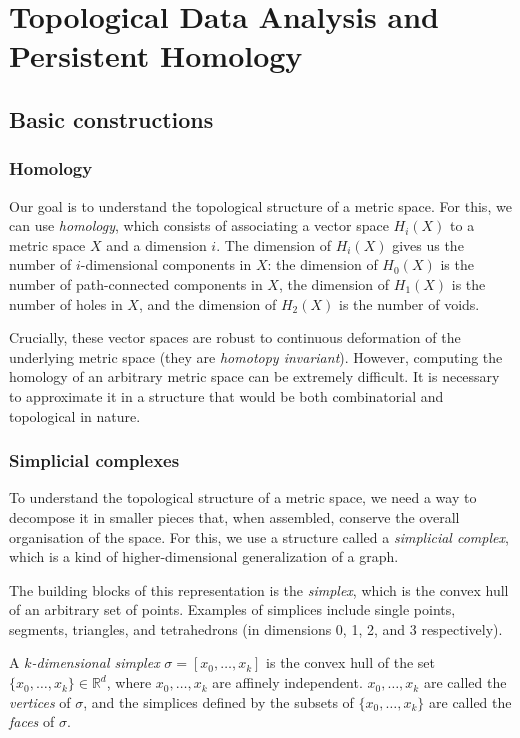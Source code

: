\documentclass[a4paper,11pt,openany,extrafontsizes]{memoir}
\begin{document}
\chapter{Topological Data Analysis and Persistent Homology}%
\label{cha:tda-ph}

\section{Basic constructions}%
\label{sec:basic-constructions}

\subsection{Homology}%
\label{sec:homology}

Our goal is to understand the topological structure of a metric
space. For this, we can use \emph{homology}, which consists of
associating a vector space $H_i(X)$ to a metric space $X$ and a
dimension $i$. The dimension of $H_i(X)$ gives us the number of
$i$-dimensional components in $X$: the dimension of $H_0(X)$ is the
number of path-connected components in $X$, the dimension of $H_1(X)$
is the number of holes in $X$, and the dimension of $H_2(X)$ is the
number of voids.

Crucially, these vector spaces are robust to continuous deformation of
the underlying metric space (they are \emph{homotopy
  invariant}). However, computing the homology of an arbitrary metric
space can be extremely difficult. It is necessary to approximate it in
a structure that would be both combinatorial and topological in
nature.

\subsection{Simplicial complexes}%
\label{sec:simplicial-complexes}

To understand the topological structure of a metric space, we need a
way to decompose it in smaller pieces that, when assembled, conserve
the overall organisation of the space. For this, we use a structure
called a \emph{simplicial complex}, which is a kind of
higher-dimensional generalization of a graph.

The building blocks of this representation is the \emph{simplex},
which is the convex hull of an arbitrary set of points. Examples of
simplices include single points, segments, triangles, and tetrahedrons
(in dimensions 0, 1, 2, and 3 respectively).

\begin{defn}[Simplex]
  A \emph{$k$-dimensional simplex} $\sigma = [x_0,\ldots,x_k]$ is the
  convex hull of the set $\{x_0,\ldots,x_k\} \in \mathbb{R}^d$, where
  $x_0,\ldots,x_k$ are affinely independent. $x_0,\ldots,x_k$ are
  called the \emph{vertices} of $\sigma$, and the simplices defined by
  the subsets of $\{x_0,\ldots,x_k\}$ are called the \emph{faces} of
  $\sigma$.
\end{defn}
\end{document}
